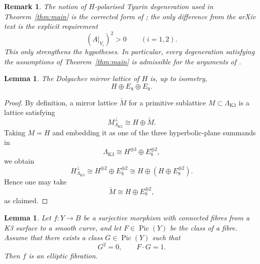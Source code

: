 \documentclass[11pt]{article}
\newtheorem{lemma}[theorem]{Lemma}
\newtheorem{remark}[theorem]{Remark}
\newcommand{\Pic}{\operatorname{Pic}}
\begin{document}
\begin{remark}\label{rem:correction}
The notion of $H$-polarised Tyurin degeneration used in Theorem~\ref{thm:main} is the corrected form of \cite[Definition~3.20]{GT24}; the only difference from the arXiv text is the explicit requirement
\[
(A|_{V_i})^2>0 \qquad (i=1,2).
\]
This only strengthens the hypotheses. In particular, every degeneration satisfying the assumptions of Theorem~\ref{thm:main} is admissible for the arguments of \cite[\S\S 3--5]{GT24}.
\end{remark}

\begin{lemma}\label{lem:mirror-lattice}
The Dolgachev mirror lattice of $H$ is, up to isometry,
\[
H\oplus E_8\oplus E_8.
\]
\end{lemma}

\begin{proof}
By definition, a mirror lattice $\check M$ for a primitive sublattice $M\subset \Lambda_{\mathrm{K3}}$ is a lattice satisfying
\[
M^\perp_{\Lambda_{\mathrm{K3}}}\cong H\oplus \check M.
\]
Taking $M=H$ and embedding it as one of the three hyperbolic-plane summands in
\[
\Lambda_{\mathrm{K3}}\cong H^{\oplus 3}\oplus E_8^{\oplus 2},
\]
we obtain
\[
H^\perp_{\Lambda_{\mathrm{K3}}}\cong H^{\oplus 2}\oplus E_8^{\oplus 2}
\cong H\oplus (H\oplus E_8^{\oplus 2}).
\]
Hence one may take
\[
\check M\cong H\oplus E_8^{\oplus 2},
\]
as claimed.
\end{proof}

\begin{lemma}\label{lem:elliptic-criterion}
Let $f\colon Y\to B$ be a surjective morphism with connected fibres from a K3 surface to a smooth curve, and let $F\in \Pic(Y)$ be the class of a fibre. Assume that there exists a class $G\in \Pic(Y)$ such that
\[
G^2=0,\qquad F\cdot G=1.
\]
Then $f$ is an elliptic fibration.
\end{lemma}
\end{document}
